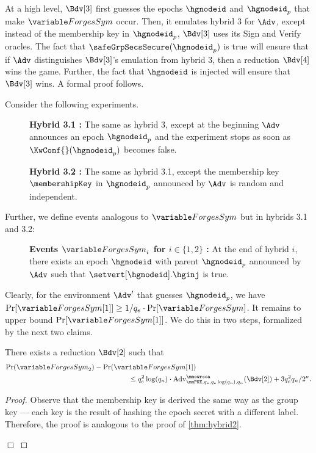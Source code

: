 At a high level, $\Bdv[3]$ first guesses the epochs $\hgnodeid$ and $\hgnodeid_p$ that make $\forgess$ occur. Then, it emulates hybrid 3 for $\Adv$, except instead of the membership key in $\hgnodeid_p$, $\Bdv[3]$ uses its \shrsufcma Sign and Verify oracles. The fact that $\safeGrpSecsSecure(\hgnodeid_p)$ is true will ensure that if $\Adv$ distinguishes $\Bdv[3]$'s emulation from hybrid 3, then a reduction $\Bdv[4]$ wins the \mmowrcca game. Further, the fact that $\hgnodeid$ is injected will ensure that $\Bdv[3]$ wins. A formal proof follows.

Consider the following experiments.
\begin{description}
  \item[] {\bf Hybrid 3.1 : } The same as hybrid 3, except at the beginning $\Adv$ announces an epoch $\hgnodeid_p$ and the experiment stops as soon as $\KwConf{}(\hgnodeid_p)$ becomes false.
  \item[] {\bf Hybrid 3.2 : } The same as hybrid 3.1, except the membership key $\membershipKey$ in $\hgnodeid_p$ announced by $\Adv$ is random and independent.
\end{description}
Further, we define events analogous to $\forgess$ but in hybrids 3.1 and 3.2:
\begin{description}
  \item[] {\bf Events $\forgess_i$ for $i\in\{1,2\}$ : } At the end of hybrid $i$, there exists an epoch $\hgnodeid$ with parent $\hgnodeid_p$ announced by $\Adv$ such that $\setvert[\hgnodeid].\hginj$ is true.
\end{description}

Clearly, for the environment $\Adv'$ that guesses $\hgnodeid_p$, we have $\Pr[\forgess[1]] \geq 1/q_e \cdot \Pr[\forgess]$. It remains to upper bound $\Pr[\forgess[1]] $. We do this in two steps, formalized by the next two claims.

\begin{claim}
  There exists a reduction $\Bdv[2]$ such that
  \begin{equation*}\begin{split}
    \Pr(\forgess_2) - \Pr(\forgess[1]) \hspace*{16em}\\\leq q_e^2\log(q_n) \cdot \textnormal{Adv}^{\mmowrcca}_{\mmPKE,q_e,q_e\log(q_n),q_n}(\Bdv[2]) + 3q_e^2q_n/2^\kappa.
  \end{split}\end{equation*}
\end{claim}
\begin{proof}
  Observe that the membership key is derived the same way as the group key --- each key is the result of hashing the epoch secret with a different label. Therefore, the proof is analogous to the proof of \cref{thm:hybrid2}.
\strut\hfill$\Box$\end{proof}


